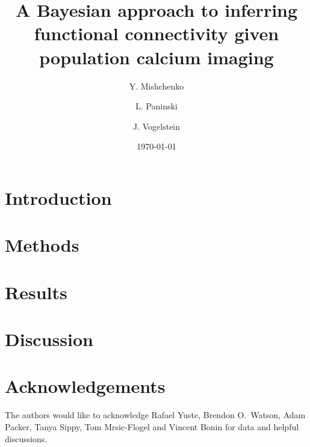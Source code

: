 \documentclass[aoas]{imsart}
\begin{document}
\author{Y. Mishchenko}
\author{L. Paninski}
\author{J. Vogelstein}

\date{\today}

\title{A Bayesian approach to inferring functional connectivity given population calcium imaging}


\maketitle

\begin{abstract}

\end{abstract}

\section{Introduction}
\label{intro}


\section{Methods}
\label{sec:methods}



\section{Results}
\label{sec:results}


\section{Discussion}
\label{sec:discussion}


\section*{Acknowledgements}
The authors would like to acknowledge Rafael Yuste, Brendon O.\ Watson, Adam Packer, Tanya Sippy, Tom Mrsic-Flogel and Vincent Bonin for data and helpful discussions.


% 

\end{document}
